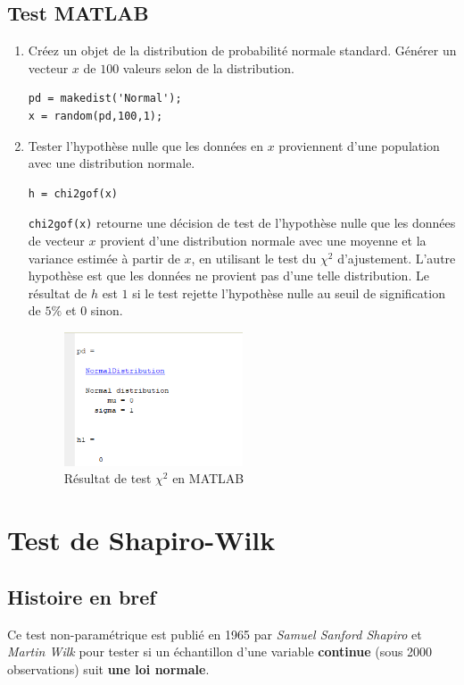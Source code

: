 \documentclass[12pt,a4paper]{article}
\begin{document}
\subsection{Test MATLAB}
\begin{enumerate}
\item Créez un objet de la distribution de probabilité normale standard. Générer un vecteur $x$ de $100$ valeurs selon de la distribution.
\begin{verbatim}
pd = makedist('Normal');
x = random(pd,100,1);
\end{verbatim}
\item Tester l’hypothèse nulle que les données en $x$ proviennent d’une population avec une distribution normale.
\begin{verbatim}
h = chi2gof(x)
\end{verbatim}
\texttt{chi2gof(x)} retourne une décision de test de l’hypothèse nulle que les données de vecteur $x$ provient d’une distribution normale avec une moyenne et la variance estimée à partir de $x$, en utilisant le test du $\chi^2$ d’ajustement. L’autre hypothèse est que les données ne provient pas d’une telle distribution. Le résultat de $h$ est $1$ si le test rejette l’hypothèse nulle au seuil de signification de $5\%$ et $0$ sinon.

\begin{figure}[!h]
\centering
\includegraphics[width=0.5\textwidth]{images/Chi_deux_test.png}
\caption{Résultat de test $\chi^2$ en MATLAB}
\label{ChiDeuxExemple}
\end{figure}
\end{enumerate}
\clearpage
\section{Test de Shapiro-Wilk}

\subsection{Histoire en bref}
Ce test non-paramétrique est publié en 1965 par \emph{Samuel Sanford Shapiro} et \emph{Martin Wilk} pour tester si un échantillon d'une variable \textbf{continue} (sous 2000 observations) suit \textbf{une loi normale}.
\end{document}
